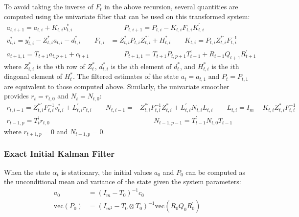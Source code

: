 \documentclass[12pt]{article}
\newcommand{\vecop}[0]{\text{vec}}
\begin{document}
	To avoid taking the inverse of $F_t$ in the above recursion, several quantities are computed using the univariate filter that can be used on this transformed system: 
	\begin{align*}
	a_{t, i+1} = a_{t,i} + K_{t,i} v_{t,i}^* &\qquad P_{t,i+1} = P_{t,i} - K_{t,i} F_{t,i} K_{t,i}^{\prime} \\
	v_{t,i}^* = y_{t,i}^* - Z_{t,i}^* a_{t,i} - d_{t,i}^* \qquad F_{t,i} &= Z_{t,i}^* P_{t,i} Z_{t,i}^{*\prime} + H_{t,i}^* \qquad K_{t,i} = P_{t,i} Z_{t,i}^{*\prime} F_{t,i}^{-1} \\ 
	a_{t+1,1} = T_{t+1} a_{t, p+1} + c_{t+1} &\qquad P_{t+1,1} = T_{t+1} P_{t,p+1} T_{t+1}^\prime + R_{t+1} Q_{t+1} R_{t+1}^\prime
	\end{align*}
	where $Z_{t,i}^*$ is the $i$th row of $Z_t^*$, $d_{t,i}^*$ is the $i$th element of $d_t^*$, and $H_{t,i}^*$ is the $i$th diagonal element of $H_t^*$. The filtered estimates of the state $a_t = a_{t,1}$ and $P_t = P_{t,1}$ are equivalent to those computed above. Similarly, the univariate smoother provides $r_t = r_{t,0}$ and $N_t = N_{t,0}$:
	\begin{align*}
	r_{t,i-1} = Z_{t,i}^{*\prime} F_{t,i}^{-1} v_{t,i}^* + L_{t,i}^{\prime} r_{t,i} \qquad N_{t,i-1} =& Z_{t,i}^{*\prime} F_{t,i}^{-1} Z_{t,i}^* + L_{t,i}^{\prime} N_{t,i} L_{t,i} \qquad L_{t,i} = I_m - K_{t,i} Z_{t,i}^* F_{t,i}^{-1}\\
	r_{t-1,p} = T_{t}^\prime r_{t,0} &\qquad N_{t-1,p-1} = T_{t-1}^\prime N_{t,0} T_{t-1}
	\end{align*}
	where $r_{t+1,p} = 0$ and $N_{t+1,p} = 0$. \\

\subsubsection*{Exact Initial Kalman Filter}
	When the state $\alpha_t$ is stationary, the initial values $a_0$ and $P_0$ can be computed as the unconditional mean and variance of the state given the system parameters: 
	\begin{align*}
	a_0 &= (I_m - T_0)^{-1} c_0 \\
	\vecop(P_0) &= (I_{m^2} - T_0 \otimes T_0)^{-1} \vecop(R_0 Q_0 R_0^\prime) 
	\end{align*}
\end{document}
